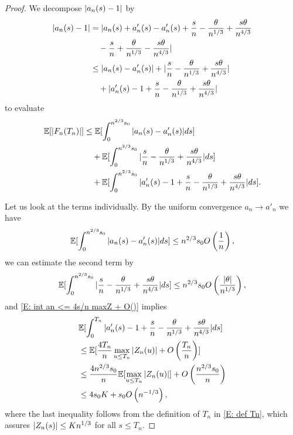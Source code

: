 \begin{proof}
	We decompose $|a_n(s) - 1|$ by
	\begin{equation}
	\begin{aligned}
	|a_n(s)-1| 
	&= | a_n(s) + a'_n(s) - a'_n(s) + \frac{s}{n} - \frac{\theta}{n^{1 / 3}} + \frac{s\theta}{n^{4 / 3}} \\
	&\quad	- \frac{s}{n} + \frac{\theta}{n^{1 / 3}} - \frac{s\theta}{n^{4 / 3}} | \\
	&\leq |a_n(s) - a'_n(s)| + 	|\frac{s}{n} - \frac{\theta}{n^{1 / 3}} + \frac{s\theta}{n^{4 / 3}}| \\
	&\quad    + |a'_n(s) - 1 + \frac{s}{n} - \frac{\theta}{n^{1 / 3}} + \frac{s\theta}{n^{4 / 3}}|
	\end{aligned}
	\end{equation}
	to evaluate
	\begin{equation}
	\begin{aligned}
	\mathbb{E}[|F_n(T_n)|] 
	&\leq \mathbb{E}[\int_{0}^{n^{2 / 3}s_0} |a_n(s) - a'_n(s)|ds] \\
	&\quad + \mathbb{E}[\int_{0}^{n^{2 / 3}s_0} |\frac{s}{n} - \frac{\theta}{n^{1 / 3}} + \frac{s\theta}{n^{4 / 3}}| ds] \\
	&\quad + \mathbb{E}[\int_{0}^{n^{2 / 3}s_0} |a'_n(s) - 1 + \frac{s}{n} - \frac{\theta}{n^{1 / 3}} + \frac{s\theta}{n^{4 / 3}}|ds].
	\end{aligned}
	\end{equation}
	
	Let us look at the terms individually. 
	By the uniform convergence $a_n \rightarrow a'_n$ we have
	\begin{equation}
	\mathbb{E}[\int_{0}^{n^{2 / 3}s_0} |a_n(s) - a'_n(s)|ds] \leq n^{2 / 3}s_0 O\left(\frac{1}{n}\right),
	\end{equation}
	we can estimate the second term by
	\begin{equation}
	\mathbb{E}[\int_{0}^{n^{2 / 3}s_0} |\frac{s}{n} - \frac{\theta}{n^{1 / 3}} + \frac{s\theta}{n^{4 / 3}}| ds]
	\leq n^{2 / 3}s_0 O\left(\frac{|\theta|}{n^{1 / 3}}\right),
	\end{equation}
	and \eqref{E: int an <= 4s/n maxZ + O()} implies
	\begin{equation}
	\begin{aligned}
	&\mathbb{E}[\int_{0}^{T_n} |a'_n(s) - 1 + \frac{s}{n} - \frac{\theta}{n^{1 / 3}} + \frac{s\theta}{n^{4 / 3}}|ds] \\
	&\leq \mathbb{E}[ \frac{4T_n}{n} \max_{u \leq T_n}|Z_n(u)| + O\left(\frac{T_n}{n}\right) ] \\
	&\leq \frac{4n^{2 / 3}s_0}{n} \mathbb{E}[\max_{u \leq T_n}|Z_n(u)|] + O\left(\frac{n^{2 / 3}s_0}{n}\right) \\
	&\leq 4s_0 K + s_0 O\left(n^{-1 / 3}\right),
	\end{aligned}
	\end{equation}
	where the last inequality follows from the definition of $T_n$ in \eqref{E: def Tn},
	which assures $|Z_n(s)| \leq Kn^{1 / 3}$ for all $s \leq T_n$. 
	

\end{proof}
